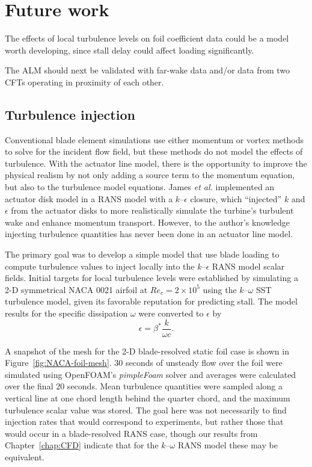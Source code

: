 \section{Future work}

The effects of local turbulence levels on foil coefficient data could be a model
worth developing, since stall delay could affect loading significantly.

The ALM should next be validated with far-wake data and/or data from two CFTs
operating in proximity of each other.


\subsection{Turbulence injection}

Conventional blade element simulations use either momentum or vortex methods to
solve for the incident flow field, but these methods do not model the effects of
turbulence. With the actuator line model, there is the opportunity to improve
the physical realism by not only adding a source term to the momentum equation,
but also to the turbulence model equations. James \emph{et al.} \cite{James2010}
implemented an actuator disk model in a RANS model with a $k$--$\epsilon$
closure, which ``injected'' $k$ and $\epsilon$ from the actuator disks to more
realistically simulate the turbine's turbulent wake and enhance momentum
transport. However, to the author's knowledge injecting turbulence quantities
has never been done in an actuator line model.

The primary goal was to develop a simple model that use blade loading to compute
turbulence values to inject locally into the $k$--$\epsilon$ RANS model scalar
fields. Initial targets for local turbulence levels were established by
simulating a 2-D symmetrical NACA 0021 airfoil at $Re_c = 2 \times 10^5$ using
the $k$--$\omega$ SST turbulence model, given its favorable reputation for
predicting stall. The model results for the specific dissipation $\omega$ were
converted to $\epsilon$ by \cite{Wilcox1994}
\begin{equation}
    \epsilon = \beta^* \frac{k}{\omega c}.
\end{equation}

A snapshot of the mesh for the 2-D blade-resolved static foil case is shown in
Figure~\ref{fig:NACA-foil-mesh}. 30 seconds of unsteady flow over the foil were
simulated using OpenFOAM's \textit{pimpleFoam} solver and averages were
calculated over the final 20 seconds. Mean turbulence quantities were sampled
along a vertical line at one chord length behind the quarter chord, and the
maximum turbulence scalar value was stored. The goal here was not necessarily to
find injection rates that would correspond to experiments, but rather those that
would occur in a blade-resolved RANS case, though our results from
Chapter~\ref{chap:CFD} indicate that for the $k$--$\omega$ RANS model these may
be equivalent.


